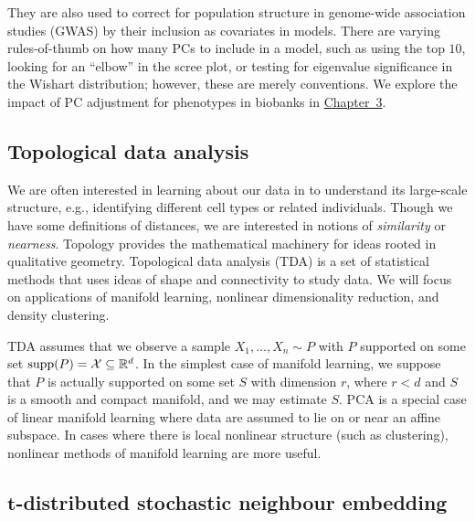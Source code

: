 They are also used to correct for population structure in genome-wide association studies (GWAS) by their inclusion as covariates in models\cite{price_principal_2006}. There are varying rules-of-thumb on how many PCs to include in a model, such as using the top $10$, looking for an ``elbow'' in the scree plot, or testing for eigenvalue significance in the Wishart distribution; however, these are merely conventions. We explore the impact of PC adjustment for phenotypes in biobanks in \hyperref[chap:chapter3]{Chapter~3}. 

\subsection{Topological data analysis}

We are often interested in learning about our data in to understand its large-scale structure, e.g., identifying different cell types or related individuals. Though we have some definitions of distances, we are interested in notions of \textit{similarity} or \textit{nearness}. Topology provides the mathematical machinery for ideas rooted in qualitative geometry\citep{carlsson_topology_2009}. Topological data analysis (TDA) is a set of statistical methods that uses ideas of shape and connectivity to study data\citep{wasserman_topological_2018}. We will focus on applications of manifold learning, nonlinear dimensionality reduction, and density clustering.

TDA assumes that we observe a sample $X_1, \dots, X_n \sim P$ with $P$ supported on some set $\operatorname{supp}(P) = \mathcal{X} \subseteq \mathbb{R}^d$. 
In the simplest case of manifold learning, we suppose that $P$ is actually supported on some set $S$ with dimension $r$, where $r < d$ and $S$ is a smooth and compact manifold, and we may estimate $S$. PCA is a special case of linear manifold learning where data are assumed to lie on or near an affine subspace\citep{wasserman_topological_2018}. In cases where there is local nonlinear structure (such as clustering), nonlinear methods of manifold learning are more useful\cite{izenman_introduction_2012}.

\subsection{\texorpdfstring{$\mathbf{t}$}{f}-distributed stochastic neighbour embedding}

